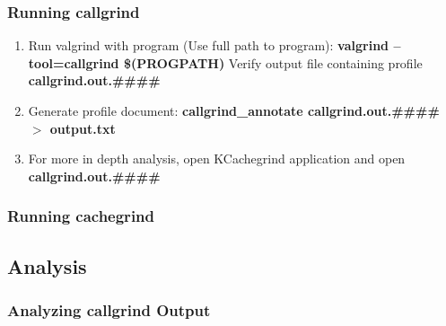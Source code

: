 \documentclass{article}
\begin{document}
			\subsubsection{Running callgrind}
				\begin{enumerate}
					\item Run valgrind with program (Use full path to program): \newline
					\textbf{valgrind --tool=callgrind \$(PROGPATH)}
					\newline Verify output file containing profile \textbf{callgrind.out.\#\#\#\#}
					\item Generate profile document: \newline
					\textbf{callgrind\_annotate callgrind.out.\#\#\#\# $>$ output.txt}
					\item For more in depth analysis, open KCachegrind application and open \textbf{callgrind.out.\#\#\#\#}
				\end{enumerate}
			\subsubsection{Running cachegrind}
		\subsection{Analysis}
			\subsubsection{Analyzing callgrind Output}
\end{document}
